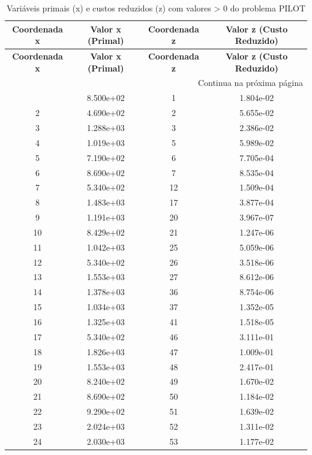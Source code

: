 \documentclass[12pt]{article}
\begin{document}
\begin{longtable}{@{}cccc@{}}
\caption{Variáveis primais (x) e custos reduzidos (z) com valores > 0 do problema PILOT} \\
\toprule
\textbf{Coordenada x} & \textbf{Valor x (Primal)} & \textbf{Coordenada z} & \textbf{Valor z (Custo Reduzido)} \\
\midrule
\endfirsthead

\toprule
\textbf{Coordenada x} & \textbf{Valor x (Primal)} & \textbf{Coordenada z} & \textbf{Valor z (Custo Reduzido)} \\
\midrule
\endhead

\midrule \multicolumn{4}{r}{{Continua na próxima página}} \\ \midrule
\endfoot

\bottomrule
\endlastfoot
1 & 8.500e+02 & 1 & 1.804e-02 \\
2 & 4.690e+02 & 2 & 5.655e-02 \\
3 & 1.288e+03 & 3 & 2.386e-02 \\
4 & 1.019e+03 & 5 & 5.989e-02 \\
5 & 7.190e+02 & 6 & 7.705e-04 \\
6 & 8.690e+02 & 7 & 8.535e-04 \\
7 & 5.340e+02 & 12 & 1.509e-04 \\
8 & 1.483e+03 & 17 & 3.877e-04 \\
9 & 1.191e+03 & 20 & 3.967e-07 \\
10 & 8.429e+02 & 21 & 1.247e-06 \\
11 & 1.042e+03 & 25 & 5.059e-06 \\
12 & 5.340e+02 & 26 & 3.518e-06 \\
13 & 1.553e+03 & 27 & 8.612e-06 \\
14 & 1.378e+03 & 36 & 8.754e-06 \\
15 & 1.034e+03 & 37 & 1.352e-05 \\
16 & 1.325e+03 & 41 & 1.518e-05 \\
17 & 5.340e+02 & 46 & 3.111e-01 \\
18 & 1.826e+03 & 47 & 1.009e-01 \\
19 & 1.553e+03 & 48 & 2.417e-01 \\
20 & 8.240e+02 & 49 & 1.670e-02 \\
21 & 8.690e+02 & 50 & 1.184e-02 \\
22 & 9.290e+02 & 51 & 1.639e-02 \\
23 & 2.024e+03 & 52 & 1.311e-02 \\
24 & 2.030e+03 & 53 & 1.177e-02 \\

\end{longtable}
\end{document}
